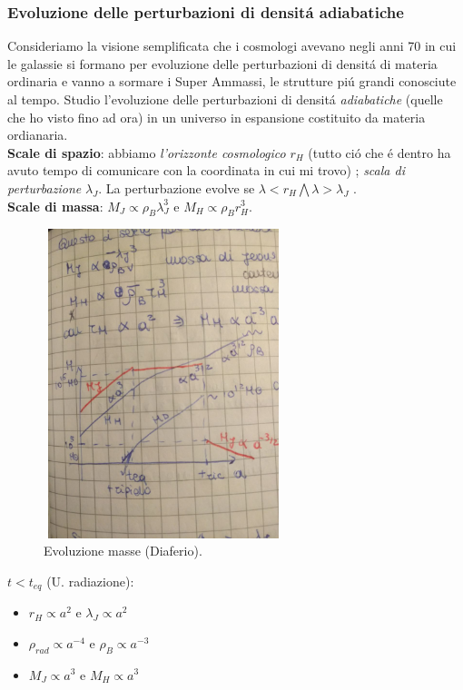 \documentclass[12pt, a4paper]{article}
\begin{document}
\subsubsection{Evoluzione delle perturbazioni di densit\'{a} adiabatiche}
Consideriamo la visione semplificata che i cosmologi avevano negli anni 70 in cui le galassie si formano per evoluzione delle perturbazioni di densit\'{a} di materia ordinaria e vanno a sormare i Super Ammassi, le strutture pi\'{u} grandi conosciute al tempo. Studio l'evoluzione delle perturbazioni di densit\'{a} \textit{adiabatiche} (quelle che ho visto fino ad ora) in un universo in espansione costituito da materia ordianaria.\\
\textbf{Scale di spazio}: abbiamo \textit{l'orizzonte cosmologico} $r_H$ (tutto ci\'{o} che \'{e} dentro ha avuto tempo di comunicare con la coordinata in cui mi trovo) ; \textit{scala di perturbazione} $\lambda_J$. La perturbazione evolve se $\lambda<r_H \bigwedge \lambda>\lambda_J$ .\\
\textbf{Scale di massa}: $M_J\propto \rho_B \lambda_J^3$ e $M_H\propto \rho_B r_H^3$. \\
\begin{figure}[htp]
    \centering
    \includegraphics[width=7cm, height=9cm]{images/massev.jpeg}
    \caption{Evoluzione masse (Diaferio).}
    \label{fig:massev1}
\end{figure}
\underline{$t<t_{eq}$} (U. radiazione): \\
\begin{itemize}
\item $r_H\propto a^2 $ e $ \lambda_J\propto a^2$
\item $\rho_{rad}\propto a^{-4}$ e $\rho_B\propto a^{-3}$
\item $M_J\propto a^{3}$ e $M_H\propto a^{3}$
\end{itemize}
\end{document}

